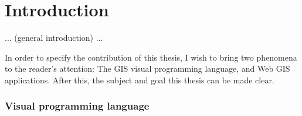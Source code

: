 \chapter{Introduction}

... (general introduction) ...

In order to specify the contribution of this thesis, I wish to bring two phenomena to the reader's attention: The GIS visual programming language, and Web GIS applications. 
After this, the subject and goal this thesis can be made clear.





\subsection*{Visual programming language}

